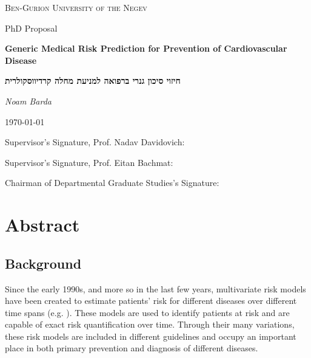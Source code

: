 \documentclass[a4paper,12pt]{article}
\begin{document}
	\begin{titlepage}
		\centering
		{\scshape\LARGE Ben-Gurion University of the Negev\par}
		\vspace{1cm}
		{\Large PhD Proposal\par}
		\vspace{2cm}
		{\huge\bfseries Generic Medical Risk Prediction for Prevention of Cardiovascular Disease\par}
		\vspace{1cm}
		\begin{hebrew}
		{\huge\bfseries חיזוי סיכון גנרי ברפואה למניעת מחלה קרדיווסקולרית\par}
		\end{hebrew}
		\vspace{1.5cm}
		{\Large\itshape Noam Barda\par}
		{\large \today\par}
		\vfill
		Supervisor's Signature, Prof. Nadav Davidovich: \underline{\hspace{5cm}}\par
		Supervisor's Signature, Prof. Eitan Bachmat: \underline{\hspace{5cm}}\par
		Chairman of Departmental Graduate Studies's Signature: \underline{\hspace{5cm}}\par
		
	\end{titlepage}
	
	
	\tableofcontents
	\newpage
	
	\section{Abstract}
	
		\subsection{Background}
		Since the early 1990s, and more so in the last few years,  multivariate risk models have been created to estimate patients' risk for different diseases over different time spans (e.g. \cite{Wilson1998,Conroy2003,DAgostino2008}). These models are used to identify patients at risk and are capable of exact risk quantification over time\cite{Goff2014}. Through their many variations, these risk models are included in different guidelines and occupy an important place in both primary prevention and diagnosis of different diseases\cite{Graham2007,Goff2014}.
		
\end{document}

